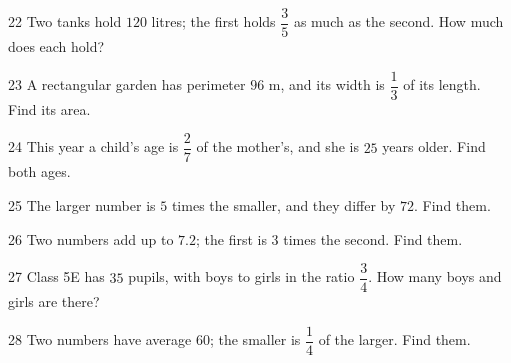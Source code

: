 \gap
\begin{probbox}{22}{\relax}
Two tanks hold $120$ litres; the first holds $\dfrac35$ as much as the second. How much does each hold?
\end{probbox}
\gap
\begin{probbox}{23}{\relax}
A rectangular garden has perimeter $96$ m, and its width is $\dfrac13$ of its length. Find its area.
\end{probbox}
\gap
\begin{probbox}{24}{\relax}
This year a child's age is $\dfrac27$ of the mother's, and she is $25$ years older. Find both ages.
\end{probbox}
\gap
\begin{probbox}{25}{\relax}
The larger number is $5$ times the smaller, and they differ by $72$. Find them.
\end{probbox}
\gap
\begin{probbox}{26}{\relax}
Two numbers add up to $7.2$; the first is $3$ times the second. Find them.
\end{probbox}
\gap
\begin{probbox}{27}{\relax}
Class 5E has $35$ pupils, with boys to girls in the ratio $\dfrac34$. How many boys and girls are there?
\end{probbox}
\gap
\begin{probbox}{28}{\relax}
Two numbers have average $60$; the smaller is $\dfrac14$ of the larger. Find them.
\end{probbox}
